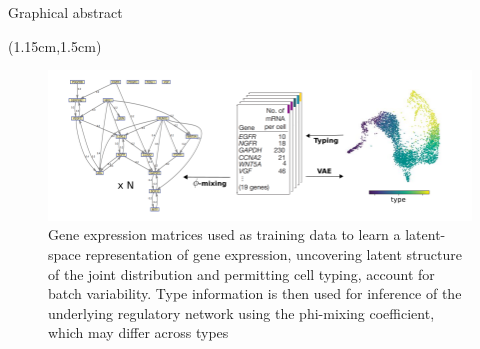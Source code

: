 \documentclass[aspectratio=1610]{beamer}					%
\begin{document}
\begin{frame}{Graphical abstract}

\begin{textblock*}{14cm}(1.15cm,1.5cm)
\begin{figure}
\includegraphics[width=14cm]{sketch.png}
\caption{Gene expression matrices used as training data to learn a latent-space representation of gene expression, uncovering latent structure of the joint distribution and permitting cell typing, account for batch variability. Type information is then used for inference of the underlying regulatory network using the phi-mixing coefficient, which may differ across types}
\end{figure}
\end{textblock*}

\end{frame}
\end{document}
